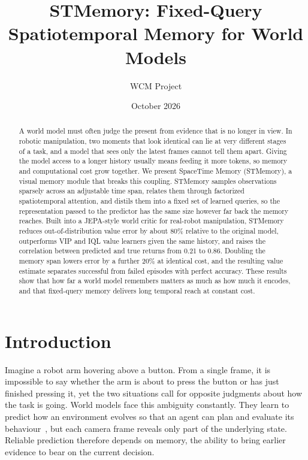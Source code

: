 \documentclass[10pt,a4paper]{article}
\title{STMemory: Fixed-Query Spatiotemporal Memory for World Models}
\author{WCM Project}
\date{October 2026}
\begin{document}
\maketitle

\begin{abstract}
A world model must often judge the present from evidence that is no longer in view. In robotic manipulation, two moments that look identical can lie at very different stages of a task, and a model that sees only the latest frames cannot tell them apart. Giving the model access to a longer history usually means feeding it more tokens, so memory and computational cost grow together. We present SpaceTime Memory (STMemory), a visual memory module that breaks this coupling. STMemory samples observations sparsely across an adjustable time span, relates them through factorized spatiotemporal attention, and distils them into a fixed set of learned queries, so the representation passed to the predictor has the same size however far back the memory reaches. Built into a JEPA-style world critic for real-robot manipulation, STMemory reduces out-of-distribution value error by about 80\% relative to the original model, outperforms VIP and IQL value learners given the same history, and raises the correlation between predicted and true returns from 0.21 to 0.86. Doubling the memory span lowers error by a further 20\% at identical cost, and the resulting value estimate separates successful from failed episodes with perfect accuracy. These results show that how far a world model remembers matters as much as how much it encodes, and that fixed-query memory delivers long temporal reach at constant cost.
\end{abstract}

\section{Introduction}

Imagine a robot arm hovering above a button. From a single frame, it is impossible to say whether the arm is about to press the button or has just finished pressing it, yet the two situations call for opposite judgments about how the task is going. World models face this ambiguity constantly. They learn to predict how an environment evolves so that an agent can plan and evaluate its behaviour~\citep{ha2018worldmodels,hafner2019planet,hafner2025mastering}, but each camera frame reveals only part of the underlying state. Reliable prediction therefore depends on memory, the ability to bring earlier evidence to bear on the current decision.
\end{document}
